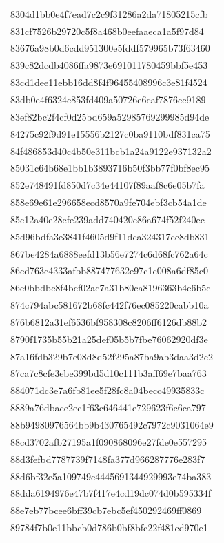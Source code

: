 \begin{tabular}{l}
8304d1bb0e4f7ead7c2c9f31286a2da71805215cfb \\
831cf7526b29720c5f8a468b0eefaaeca1a5f97d84 \\
83676a98b0d6cdd951300e5fddf579965b73f63460 \\
839c82dcdb4086ffa9873e691011780459bbf5e453 \\
83cd1dee11ebb16dd8f4f96455408996c3e81f4524 \\
83db0e4f6324c853fd409a50726e6caf7876cc9189 \\
83ef82bc2f4cf0d25bd659a52985769299985d94de \\
84275c92f9d91e15556b2127c0ba9110bdf831ca75 \\
84f486853d40c4b50e311bcb1a24a9122e937132a2 \\
85031c64b68e1bb1b3893716b50f3bb77f0bf8ec95 \\
852e748491fd850d7c34e44107f89aaf8c6e05b7fa \\
858e69e61e296658ecd8570a9fe704ebf3cb54a1de \\
85c12a40e28efe239add740420c86a674f52f240ec \\
85d96bdfa3e3841f4605d9f11dca324317cc8db831 \\
867be4284a6888eefd13b56e7274c6d68fc762a64c \\
86cd763c4333afbb887477632e97c1c008a6df85c0 \\
86e0bbdbc8f4bcf02ac7a31b80ca8196363b4e6b5c \\
874c794abc581672b68fc442f76ec085220cabb10a \\
876b6812a31ef6536bf958308c8206ff6126db88b2 \\
8790f1735b55b21a25def05b5b7fbe76062920df3e \\
87a16fdb329b7e08d8d52f295a87ba9ab3daa3d2c2 \\
87ca7c8cfe3ebe399bd5d10c111b3aff69e7baa763 \\
884071dc3e7a6fb81ee5f28fc8a04becc49935833c \\
8889a76dbace2ec1f63c646441e729623f6c6ca797 \\
88b94980976564bb9b430765492c7972c9031064e9 \\
88cd3702afb27195a1f090868096e27fde0e557295 \\
88d3fefbd7787739f7148fa377d966287776e283f7 \\
88d6bf32e5a109749c4445691344929993e74ba383 \\
88dda6194976e47b7f417e4cd19dc074d0b595334f \\
88e7eb77bcee6bff39cb7ebc5ef450292469ff0869 \\
89784f7b0e11bbcb0d786b0bf8bfc22f481cd970e1 \\

\end{tabular}
